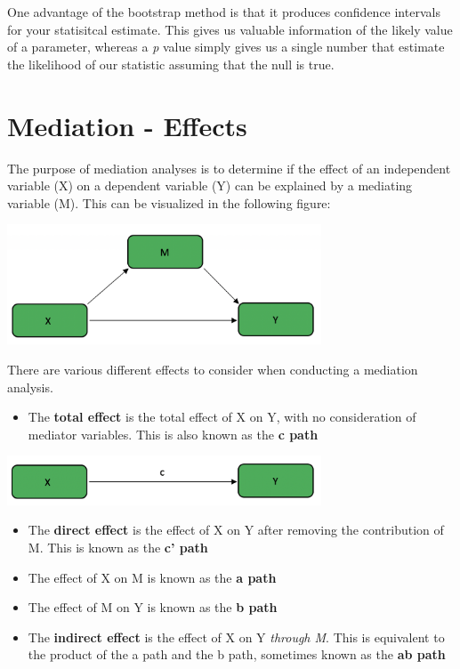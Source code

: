 \documentclass[]{book}
\providecommand{\tightlist}{%
  \setlength{\itemsep}{0pt}\setlength{\parskip}{0pt}}
\begin{document}
One advantage of the bootstrap method is that it produces confidence intervals for your statisitcal estimate. This gives us valuable information of the likely value of a parameter, whereas a \emph{p} value simply gives us a single number that estimate the likelihood of our statistic assuming that the null is true.

\hypertarget{mediation---effects}{%
\section{Mediation - Effects}\label{mediation---effects}}

The purpose of mediation analyses is to determine if the effect of an independent variable (X) on a dependent variable (Y) can be explained by a mediating variable (M). This can be visualized in the following figure:

\includegraphics[width=0.7\textwidth,height=\textheight]{images/mediation_model.png}

There are various different effects to consider when conducting a mediation analysis.

\begin{itemize}
\tightlist
\item
  The \textbf{total effect} is the total effect of X on Y, with no consideration of mediator variables. This is also known as the \textbf{c path}
\end{itemize}

\includegraphics[width=0.7\textwidth,height=\textheight]{images/mediation_total.png}

\begin{itemize}
\item
  The \textbf{direct effect} is the effect of X on Y after removing the contribution of M. This is known as the \textbf{c' path}
\item
  The effect of X on M is known as the \textbf{a path}
\item
  The effect of M on Y is known as the \textbf{b path}
\item
  The \textbf{indirect effect} is the effect of X on Y \emph{through M}. This is equivalent to the product of the a path and the b path, sometimes known as the \textbf{ab path}
\end{itemize}
\end{document}
